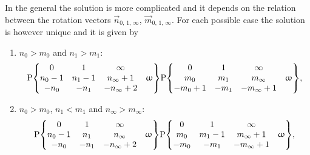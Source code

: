 In the general the solution is more complicated and it depends on the relation between the rotation vectors $\vec{n}_{0,\, 1,\, \infty}$, $\vec{m}_{0,\, 1,\, \infty}$.
For each possible case the solution is however unique and it is given by
\begin{enumerate}
  \item $n_{0} > m_{0}$ and $n_{1} > m_{1}$:
    \begin{equation}
      \rP\qty{
        \mqty{
          0
          &
          1
          &
          \infty
          &
          \\
          n_{0} - 1
          &
          n_{1} - 1
          &
          n_{\infty} + 1
          &
          \omega
          \\
          -n_{0}
          &
          -n_{1}
          &
          -n_{\infty} + 2
          &
        }
      }
      \rP\qty{
        \mqty{
          0
          &
          1
          &
          \infty
          &
          \\
          m_{0}
          &
          m_{1}
          &
          m_{\infty}
          &
          \omega
          \\
          -m_{0} + 1
          &
          -m_{1}
          &
          -m_{\infty} + 1
          &
        }
      },
      \label{eq:X_solution>>}
   \end{equation}

   \item $n_{0} > m_{0}$, $n_{1} < m_{1}$ and $n_{\infty} > m_{\infty}$:
     \begin{equation}
       \rP\qty{
         \mqty{
           0
           &
           1
           &
           \infty
           &
           \\
           n_{0} - 1
           &
           n_{1}
           &
           n_{\infty}
           &
           \omega
           \\
           -n_{0}
           &
           -n_{1}
           &
           -n_{\infty} + 2
           &
         }
       }
       \rP\qty{
         \mqty{
           0
           &
           1
           &
           \infty
           &
           \\
           m_{0}
           &
           m_{1} - 1
           &
           m_{\infty} + 1
           &
           \omega
           \\
           -m_{0}
           &
           -m_{1}
           &
           -m_{\infty} + 1
           &
         }
       },
       \label{eq:X_solution><>}
     \end{equation}


\end{enumerate}
